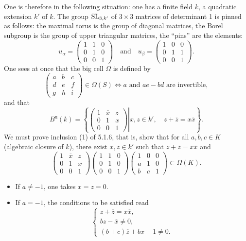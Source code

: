 \label{XXVI.5.1.10}
One is therefore in the following situation: one has a finite field $k$, a quadratic extension $k'$ of $k$. The group $\operatorname{SL}_{3,k'}$ of $3\times3$ matrices of determinant 1 is pinned as follows: the maximal torus is the group of diagonal matrices, the Borel subgroup is the group of upper triangular matrices, the ``pins'' are the elements:
\[
 u_\alpha=\begin{pmatrix}1&1&0\\0&1&0\\0&0&1\end{pmatrix}
 \quad\text{and}\quad
 u_\beta=\begin{pmatrix}1&0&0\\0&1&1\\0&0&1\end{pmatrix}.
\]
One sees at once that the big cell $\Omega$ is defined by
\[
 \begin{pmatrix}a&b&c\\d&e&f\\g&h&i\end{pmatrix}\in\Omega(S)
 \iff a\text{ and }ae-bd\text{ are invertible},
\]
and that
\[
 B^{\mathrm u}(k)=\left\{\left.\begin{pmatrix}1&\overline{x}&z\\0&1&x\\0&0&1\end{pmatrix}\right|
 x,z\in k',\quad z+\overline z=x\overline x\right\}.
\]
We must prove inclusion (1) of 5.1.6, that is, show that for all $a,b,c\in K$ (algebraic closure of $k$), there exist $x,z\in k'$ such that $z+\overline z=x\overline x$ and
\begin{equation}\tag{1}
 \begin{pmatrix}1&\overline{x}&z\\0&1&x\\0&0&1\end{pmatrix}
 \begin{pmatrix}1&1&0\\0&1&0\\0&0&1\end{pmatrix}
 \begin{pmatrix}1&0&0\\a&1&0\\b&c&1\end{pmatrix}\subset\Omega(K).
\end{equation}
\begin{itemize}
\item If $a\neq-1$, one takes $x=z=0$.
\item If $a=-1$, the conditions to be satisfied read
\[
 \begin{cases}
 z+\overline z=x\overline x,\\
 bz-\overline x\neq0,\\
 (b+c)\overline z+bx-1\neq0.
 \end{cases}
\]
\end{itemize}

